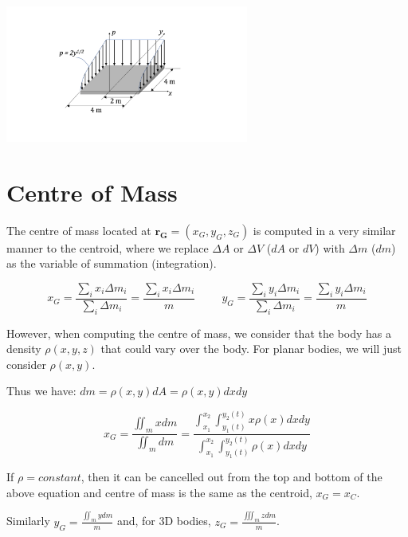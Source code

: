 \documentclass[12pt,letterpaper,twoside]{report}
\begin{document}
\includegraphics[trim={5cm 2cm 5cm 2cm},clip,width=0.6\textwidth, left]{Slide39} 


\vspace*{10\baselineskip}

\newpage

\section{Centre of Mass}

The centre of mass located at $\bm{r_G}=(x_G,y_G,z_G)$ is computed in a very similar manner to the centroid, where we replace $\Delta A$ or $\Delta V$ ($dA$ or $dV$) with $\Delta m$ ($dm$) as the variable of summation (integration).

\[
x_G = \frac{\displaystyle \sum_{i} x_i \Delta m_i}{\displaystyle \sum_{i} \Delta m_i} = \frac{\displaystyle \sum_{i} x_i \Delta m_i}{m} \hspace{1cm} y_G = \frac{\displaystyle \sum_{i} y_i \Delta m_i}{\displaystyle \sum_{i} \Delta m_i} = \frac{\displaystyle \sum_{i} y_i \Delta m_i}{m} 
\]

However, when computing the centre of mass, we consider that the body has a density $\rho (x,y,z)$ that could vary over the body.  For planar bodies, we will just consider $\rho (x,y)$.

Thus we have: $dm= \rho (x,y) dA = \rho (x,y) dx dy$

\vspace*{8\baselineskip}

\[
x_G = \frac{\displaystyle  \iint_m x dm }{\displaystyle  \iint_m dm} = \frac{\displaystyle \int_{x_1}^{{x_2}} \int_{y_1(t)}^{{y_2(t)}} x \rho(x) dx dy}{\displaystyle \int_{x_1}^{{x_2}} \int_{y_1(t)}^{{y_2(t)}} \rho(x) dx dy}
\]

If $\rho = constant$, then it can be cancelled out from the top and bottom of the above equation and centre of mass is the same as the centroid, $x_G=x_C$. 

Similarly $\displaystyle y_G = \frac{ \iint_m y dm }{m}$ and, for 3D bodies, $\displaystyle z_G = \frac{ \iiint_m z dm }{m}$. 
\end{document}
